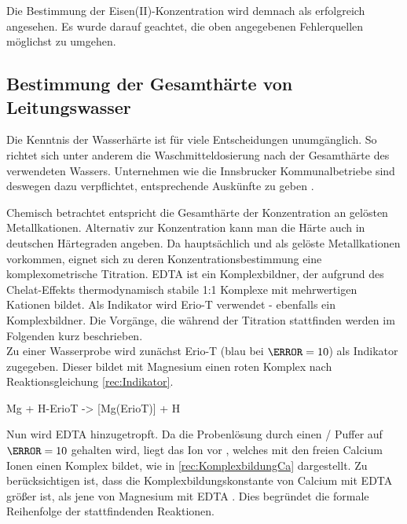 \documentclass{article}
\begin{document}
        Die Bestimmung der Eisen(II)-Konzentration wird demnach als erfolgreich angesehen. Es wurde darauf geachtet, die oben angegebenen Fehlerquellen möglichst zu umgehen.
        
    \pagebreak
    
    \subsection{Bestimmung der Gesamthärte von Leitungswasser} \label{sec:harte}
      
      Die Kenntnis der Wasserhärte ist für viele Entscheidungen unumgänglich. So richtet sich unter anderem die Waschmitteldosierung nach der Gesamthärte des verwendeten Wassers. Unternehmen wie die Innsbrucker Kommunalbetriebe sind deswegen dazu verpflichtet, entsprechende Auskünfte zu geben \cite{ikb}.
      
      Chemisch betrachtet entspricht die Gesamthärte der Konzentration an gelösten Metallkationen. Alternativ zur Konzentration kann man die Härte auch in deutschen Härtegraden angeben. Da hauptsächlich  und  als gelöste Metallkationen vorkommen, eignet sich zu deren Konzentrationsbestimmung eine komplexometrische Titration. EDTA ist ein Komplexbildner, der aufgrund des Chelat-Effekts thermodynamisch stabile 1:1 Komplexe mit mehrwertigen Kationen bildet. Als Indikator wird Erio-T verwendet - ebenfalls ein Komplexbildner. Die Vorgänge, die während der Titration stattfinden werden im Folgenden kurz beschrieben. \\
      
      Zu einer Wasserprobe wird zunächst Erio-T (blau bei $\pH=10$) als Indikator zugegeben. Dieser bildet mit Magnesium einen roten Komplex nach Reaktionsgleichung \ref{rec:Indikator}. 
        
      \begin{reaction}
        Mg\pch[2]\aq{} + H-ErioT\mch[2]\aq{} -> [Mg(ErioT)]\mch\aq{} + H\pch\aq{} \label{rec:Indikator}
      \end{reaction}
      
      Nun wird EDTA hinzugetropft. Da die Probenlösung durch einen / Puffer auf $\pH=10$ gehalten wird, liegt das  Ion vor \cite[S. 142]{JanderBlasius}, welches mit den freien Calcium Ionen einen Komplex bildet, wie in \ref{rec:KomplexbildungCa} dargestellt. Zu berücksichtigen ist, dass die Komplexbildungskonstante von Calcium mit EDTA größer ist, als jene von Magnesium mit EDTA \cite{JanderBlasius}. Dies begründet die formale Reihenfolge der stattfindenden Reaktionen. 
      
\end{document}
